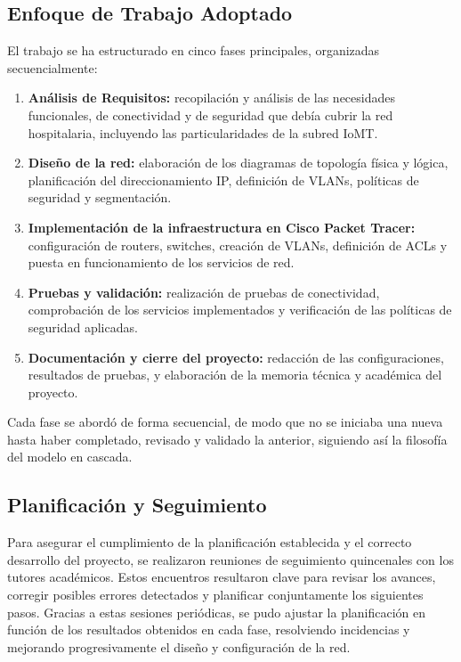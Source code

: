 \subsection{Enfoque de Trabajo Adoptado}
El trabajo se ha estructurado en cinco fases principales, organizadas secuencialmente:
\begin{enumerate}
    \item \textbf{Análisis de Requisitos:} recopilación y análisis de las necesidades funcionales, de conectividad y de seguridad que debía cubrir la red hospitalaria, 
    incluyendo las particularidades de la subred IoMT.
    \item \textbf{Diseño de la red:} elaboración de los diagramas de topología física y lógica, planificación del direccionamiento IP, definición de VLANs, políticas de 
    seguridad y segmentación.
    \item \textbf{Implementación de la infraestructura en Cisco Packet Tracer:} configuración de routers, switches, creación de VLANs, definición de ACLs y puesta en 
    funcionamiento de los servicios de red.
    \item \textbf{Pruebas y validación:} realización de pruebas de conectividad, comprobación de los servicios implementados y verificación de las políticas de seguridad aplicadas.
    \item \textbf{Documentación y cierre del proyecto:} redacción de las configuraciones, resultados de pruebas, y elaboración de la memoria técnica y académica del proyecto.
\end{enumerate}
Cada fase se abordó de forma secuencial, de modo que no se iniciaba una nueva hasta haber completado, revisado y validado la anterior, siguiendo así la filosofía del modelo en cascada.

\subsection{Planificación y Seguimiento}
Para asegurar el cumplimiento de la planificación establecida y el correcto desarrollo del proyecto, se realizaron reuniones de seguimiento quincenales con los tutores 
académicos. Estos encuentros resultaron clave para revisar los avances, corregir posibles errores detectados y planificar conjuntamente los siguientes pasos. Gracias a 
estas sesiones periódicas, se pudo ajustar la planificación en función de los resultados obtenidos en cada fase, resolviendo incidencias y mejorando progresivamente el 
diseño y configuración de la red. \\

